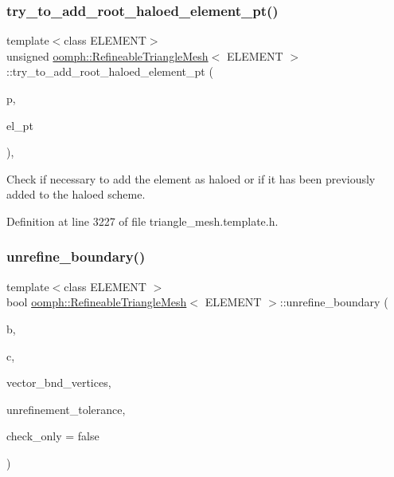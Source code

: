 \subsubsection{\texorpdfstring{try\+\_\+to\+\_\+add\+\_\+root\+\_\+haloed\+\_\+element\+\_\+pt()}{try\_to\_add\_root\_haloed\_element\_pt()}}
{\footnotesize\ttfamily template$<$class E\+L\+E\+M\+E\+NT$>$ \\
unsigned \hyperlink{classoomph_1_1RefineableTriangleMesh}{oomph\+::\+Refineable\+Triangle\+Mesh}$<$ E\+L\+E\+M\+E\+NT $>$\+::try\+\_\+to\+\_\+add\+\_\+root\+\_\+haloed\+\_\+element\+\_\+pt (\begin{DoxyParamCaption}\item[{const unsigned \&}]{p,  }\item[{Generalised\+Element $\ast$\&}]{el\+\_\+pt }\end{DoxyParamCaption})\hspace{0.3cm}{\ttfamily [inline]}, {\ttfamily [protected]}}



Check if necessary to add the element as haloed or if it has been previously added to the haloed scheme. 



Definition at line 3227 of file triangle\+\_\+mesh.\+template.\+h.

\mbox{\label{classoomph_1_1RefineableTriangleMesh_a504b89cdb0149dc7cbbf50bc270829fe}} 
\subsubsection{\texorpdfstring{unrefine\+\_\+boundary()}{unrefine\_boundary()}}
{\footnotesize\ttfamily template$<$class E\+L\+E\+M\+E\+NT $>$ \\
bool \hyperlink{classoomph_1_1RefineableTriangleMesh}{oomph\+::\+Refineable\+Triangle\+Mesh}$<$ E\+L\+E\+M\+E\+NT $>$\+::unrefine\+\_\+boundary (\begin{DoxyParamCaption}\item[{const unsigned \&}]{b,  }\item[{const unsigned \&}]{c,  }\item[{Vector$<$ Vector$<$ double $>$ $>$ \&}]{vector\+\_\+bnd\+\_\+vertices,  }\item[{double \&}]{unrefinement\+\_\+tolerance,  }\item[{const bool \&}]{check\+\_\+only = {\ttfamily false} }\end{DoxyParamCaption})\hspace{0.3cm}{\ttfamily [protected]}}



